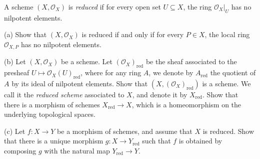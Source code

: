 \begin{exe}
	\label{2.2.3}
	A scheme $\left(X, \mathcal{O}_{X}\right)$ is \emph{reduced} if for every open set $U \subseteq X$, the ring $\mathcal{O}_{X}| _{U}$ has no nilpotent elements.
	
	(a) Show that $\left(X, \mathcal{O}_{X}\right)$ is reduced if and only if for every $P \in X$, the local ring $\mathcal{O}_{X, P}$ has no nilpotent elements.
	
	(b) Let $\left(X, \mathcal{O}_{X}\right)$ be a scheme. Let $(\mathcal{O}_X)_{\mathrm{red}}$ be the sheaf associated to the presheaf $U\mapsto\mathcal{O}_X(U)_{\mathrm{red}}$, where for any ring $A$, we denote by $A_{\mathrm{red}}$ the quotient of $A$ by its ideal of nilpotent elements. Show that $\left(X,\left(\mathcal{O}_{X}\right)_{\mathrm{red}}\right)$ is a scheme. We call it the \emph{reduced scheme} associated to $X$, and denote it by $X_\mathrm{red}$. Show that there is a morphism of schemes $X_{\mathrm{red}} \rightarrow X$, which is a homeomorphism on the underlying topological spaces.
	
	(c) Let $f: X \rightarrow Y$ be a morphism of schemes, and assume that $X$ is reduced. Show that there is a unique morphism $g: X \rightarrow Y_{\mathrm{red}}$ such that $f$ is obtained by composing $g$ with the natural map $Y_{\mathrm{red}} \rightarrow Y$.
	
\end{exe}

